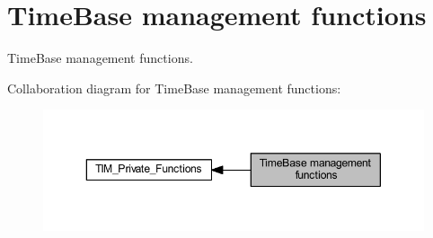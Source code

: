 \hypertarget{group___t_i_m___group1}{}\section{Time\+Base management functions}
\label{group___t_i_m___group1}


Time\+Base management functions.  


Collaboration diagram for Time\+Base management functions\+:\nopagebreak
\begin{figure}[H]
\begin{center}
\leavevmode
\includegraphics[width=350pt]{group___t_i_m___group1}
\end{center}
\end{figure}
